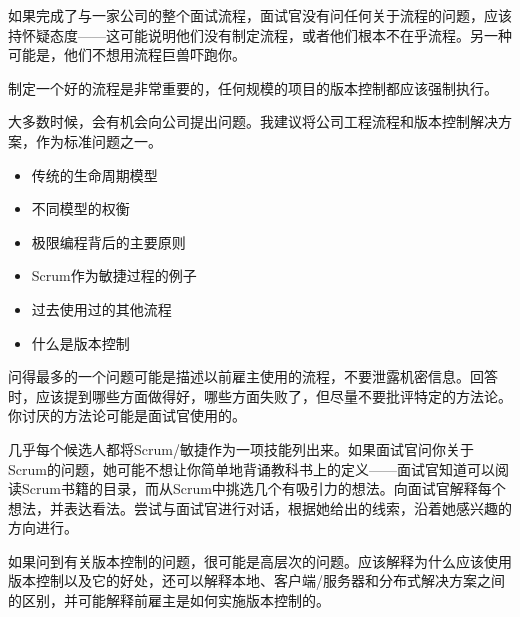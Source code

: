 
如果完成了与一家公司的整个面试流程，面试官没有问任何关于流程的问题，应该持怀疑态度——这可能说明他们没有制定流程，或者他们根本不在乎流程。另一种可能是，他们不想用流程巨兽吓跑你。

制定一个好的流程是非常重要的，任何规模的项目的版本控制都应该强制执行。

大多数时候，会有机会向公司提出问题。我建议将公司工程流程和版本控制解决方案，作为标准问题之一。


\begin{itemize}
\item
传统的生命周期模型

\item
不同模型的权衡

\item
极限编程背后的主要原则

\item
Scrum作为敏捷过程的例子

\item
过去使用过的其他流程

\item
什么是版本控制
\end{itemize}


问得最多的一个问题可能是描述以前雇主使用的流程，不要泄露机密信息。回答时，应该提到哪些方面做得好，哪些方面失败了，但尽量不要批评特定的方法论。你讨厌的方法论可能是面试官使用的。

几乎每个候选人都将Scrum/敏捷作为一项技能列出来。如果面试官问你关于Scrum的问题，她可能不想让你简单地背诵教科书上的定义——面试官知道可以阅读Scrum书籍的目录，而从Scrum中挑选几个有吸引力的想法。向面试官解释每个想法，并表达看法。尝试与面试官进行对话，根据她给出的线索，沿着她感兴趣的方向进行。

如果问到有关版本控制的问题，很可能是高层次的问题。应该解释为什么应该使用版本控制以及它的好处，还可以解释本地、客户端/服务器和分布式解决方案之间的区别，并可能解释前雇主是如何实施版本控制的。

